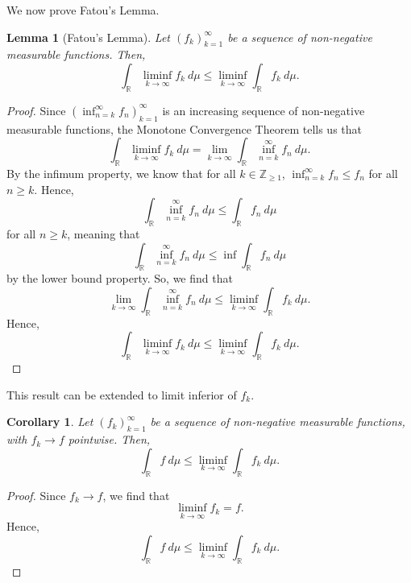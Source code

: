 \documentclass[a4paper, openany]{memoir}
\theoremstyle{definition}
\theoremstyle{plain}
\newtheorem{lemma}[definition]{Lemma}
\newtheorem{corollary}[definition]{Corollary}
\begin{document}
    We now prove Fatou's Lemma.
    \begin{lemma}[Fatou's Lemma]
        Let $(f_k)_{k=1}^\infty$ be a sequence of non-negative measurable functions. Then,
        \[\int_{\mathbb{R}} \liminf_{k \to \infty} f_k \ d\mu \leq \liminf_{k \to \infty} \int_{\mathbb{R}} f_k \ d\mu.\]
    \end{lemma}
    \begin{proof}
        Since $(\inf_{n=k}^\infty f_n)_{k=1}^\infty$ is an increasing sequence of non-negative measurable functions, the Monotone Convergence Theorem tells us that 
        \[\int_{\mathbb{R}} \liminf_{k \to \infty} f_k \ d\mu = \lim_{k \to \infty} \int_{\mathbb{R}} \inf_{n=k}^\infty f_n \ d\mu.\]
        By the infimum property, we know that for all $k \in \mathbb{Z}_{\geq 1}$, $\inf_{n=k}^\infty f_n \leq f_n$ for all $n \geq k$. Hence,
        \[\int_{\mathbb{R}} \inf_{n=k}^\infty f_n \ d\mu \leq \int_{\mathbb{R}} f_n \ d\mu\]
        for all $n \geq k$, meaning that
        \[\int_{\mathbb{R}} \inf_{n=k}^\infty f_n \ d\mu \leq \inf \int_{\mathbb{R}} f_n \ d\mu\]
        by the lower bound property. So, we find that
        \[\lim_{k \to \infty} \int_{\mathbb{R}} \inf_{n=k}^\infty f_n \ d\mu \leq \liminf_{k \to \infty} \int_{\mathbb{R}} f_k \ d\mu.\]
        Hence,
        \[\int_{\mathbb{R}} \liminf_{k \to \infty} f_k \ d\mu \leq \liminf_{k \to \infty} \int_{\mathbb{R}} f_k \ d\mu.\]
    \end{proof}
    \noindent This result can be extended to limit inferior of $f_k$.
    \begin{corollary}
        Let $(f_k)_{k=1}^\infty$ be a sequence of non-negative measurable functions, with $f_k \to f$ pointwise. Then,
        \[\int_{\mathbb{R}} f \ d\mu \leq \liminf_{k \to \infty} \int_{\mathbb{R}} f_k \ d\mu.\]
    \end{corollary}
    \begin{proof}
        Since $f_k \to f$, we find that
        \[\liminf_{k \to \infty} f_k = f.\]
        Hence,
        \[\int_{\mathbb{R}} f \ d\mu \leq \liminf_{k \to \infty} \int_{\mathbb{R}} f_k \ d\mu.\]
    \end{proof}
\end{document}
